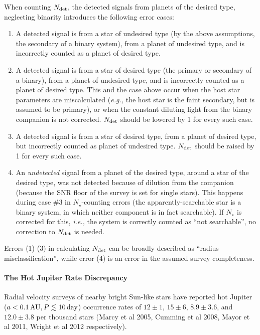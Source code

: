 When counting $N_{\rm det}$, the detected signals from planets of the desired 
type, neglecting binarity introduces the following error cases:
\begin{enumerate}
    \item 
    A detected signal is from a star of undesired type (by the above 
    assumptions, 
    the secondary of a binary system), from a planet of undesired type, and is 
    incorrectly counted as a planet of desired type.
    \item
    A detected signal is from a star of desired type (the primary or secondary 
    of 
    a binary), from a planet of undesired type, and is incorrectly counted 
    as a planet of desired type.
    This and the case above occur when the host star parameters are 
    miscalculated 
    ({\it e.g.,} the host star is the faint secondary, but is assumed to be 
    primary), or when the constant diluting light from the binary companion is 
    not corrected.
    $N_{\rm det}$ should be lowered by 1 for every such case.
    \item
    A detected signal is from a star of desired type, from a planet of desired 
    type, but incorrectly counted as planet of undesired type.
    $N_{\rm det}$ should be raised by 1 for every such case.
    \item
    An {\it undetected} signal from a planet of the desired type, around a 
    star of 
    the desired type, was not detected because of dilution from the companion 
    (because the SNR floor of the survey is set for single stars). 
    This happens during case \#3 in $N_\star$-counting errors (the 
    apparently-searchable star is a binary system, in which neither component 
    is 
    in fact searchable). If $N_\star$ is corrected for this, {\it i.e.,} the 
    system is correctly counted as ``not searchable'', no correction to 
    $N_{\rm 
        det}$ is needed.
\end{enumerate}

Errors (1)-(3) in calculating $N_{\rm det}$ can be broadly described as 
``radius misclassification'', while error (4) is an error in the assumed 
survey completeness.



\paragraph{The Hot Jupiter Rate Discrepancy}

Radial velocity surveys of nearby bright Sun-like stars have reported hot 
Jupiter ($a<0.1\,{\rm AU}, P\lesssim 10\,{\rm day}$) occurrence rates of
$12\pm 1$, $15\pm 6$, $8.9 \pm 3.6$, and $12.0 \pm 3.8$ per thousand stars
(Marcy et al 2005, Cumming et al 2008, Mayor et al 2011, Wright et al 2012 
respectively).

